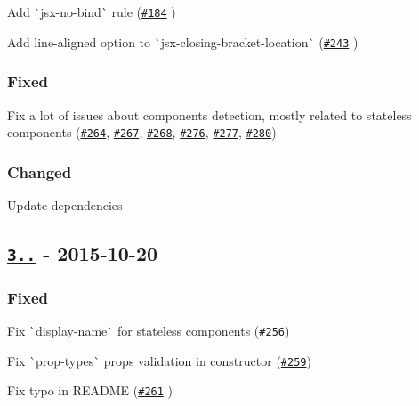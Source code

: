 \begin{DoxyItemize}
\item Add \`{}jsx-\/no-\/bind\`{} rule (\href{https://github.com/yannickcr/eslint-plugin-react/issues/184}{\tt \#184} )
\item Add line-\/aligned option to \`{}jsx-\/closing-\/bracket-\/location\`{} (\href{https://github.com/yannickcr/eslint-plugin-react/issues/243}{\tt \#243} )
\end{DoxyItemize}

\subsubsection*{Fixed}


\begin{DoxyItemize}
\item Fix a lot of issues about components detection, mostly related to stateless components (\href{https://github.com/yannickcr/eslint-plugin-react/issues/264}{\tt \#264}, \href{https://github.com/yannickcr/eslint-plugin-react/issues/267}{\tt \#267}, \href{https://github.com/yannickcr/eslint-plugin-react/issues/268}{\tt \#268}, \href{https://github.com/yannickcr/eslint-plugin-react/issues/276}{\tt \#276}, \href{https://github.com/yannickcr/eslint-plugin-react/issues/277}{\tt \#277}, \href{https://github.com/yannickcr/eslint-plugin-react/issues/280}{\tt \#280})
\end{DoxyItemize}

\subsubsection*{Changed}


\begin{DoxyItemize}
\item Update dependencies
\end{DoxyItemize}

\subsection*{\href{https://github.com/yannickcr/eslint-plugin-react/compare/v3.6.2...v3.6.3}{\tt 3..} -\/ 2015-\/10-\/20}

\subsubsection*{Fixed}


\begin{DoxyItemize}
\item Fix \`{}display-\/name\`{} for stateless components (\href{https://github.com/yannickcr/eslint-plugin-react/issues/256}{\tt \#256})
\item Fix \`{}prop-\/types\`{} props validation in constructor (\href{https://github.com/yannickcr/eslint-plugin-react/issues/259}{\tt \#259})
\item Fix typo in R\+E\+A\+D\+ME (\href{https://github.com/yannickcr/eslint-plugin-react/pull/261}{\tt \#261} )
\end{DoxyItemize}

